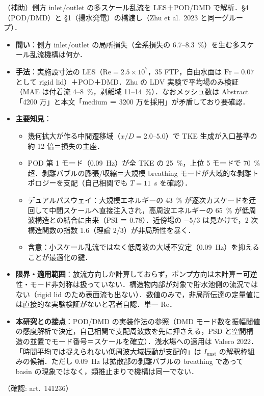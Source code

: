 \documentclass[11pt]{jsarticle}
\newcommand{\litref}[1]{{\large\bfseries\color{citecolor}#1}}
\begin{document}
\noindent\litref{Bai et al. (2026)}\quad（補助）側方 inlet/outlet の多スケール乱流を LES＋POD/DMD で解析．§4（POD/DMD）と §1（揚水発電）の橋渡し（Zhu et al.\ 2023 と同一グループ）．
\begin{itemize}
  \item \textbf{問い}：側方 inlet/outlet の局所損失（全系損失の 6.7--8.3~\%）を生む多スケール乱流機構は何か．
  \item \textbf{手法}：実施設寸法の LES（$\mathrm{Re} = 2.5\times10^7$，35 FTP，自由水面は $\mathrm{Fr} = 0.07$ として rigid lid）＋POD＋DMD．Zhu の LDV 実験で平均場のみ検証（MAE は付着流 4--8~\%，剥離域 11--14~\%）．なおメッシュ数は Abstract「4200 万」と本文「medium ＝ 3200 万を採用」が矛盾しており要確認．
  \item \textbf{主要知見}：
  \begin{itemize}
    \item 幾何拡大が作る中間遷移域（$x/D = 2.0$--$5.0$）で TKE 生成が入口基準の約 12 倍＝損失の主座．
    \item POD 第 1 モード（0.09~Hz）が全 TKE の 25~\%，上位 5 モードで 70~\% 超．剥離バブルの膨張/収縮＝大規模 breathing モードが大域的な剥離トポロジーを支配（自己相関でも $T = 11$~s を確認）．
    \item デュアルパスウェイ：大規模エネルギーの 43~\% が逐次カスケードを迂回して中間スケールへ直接注入され，高周波エネルギーの 65~\% が低周波構造との結合に由来（PSI ＝ 0.78）．近傍場の $-5/3$ は見かけで，2 次構造関数の指数 1.6（理論 2/3）が非局所性を暴く．
    \item 含意：小スケール乱流ではなく低周波の大域不安定（0.09~Hz）を抑えることが最適化の鍵．
  \end{itemize}
  \item \textbf{限界・適用範囲}：放流方向しか計算しておらず，ポンプ方向は未計算＝可逆性・モード非対称は扱っていない．構造物内部が対象で貯水池側の流況ではない（rigid lid のため表面流も出ない）．数値のみで，非局所伝達の定量値には直接的な実験検証がないと著者自認．単一 Re．
  \item \textbf{本研究との接点}：POD/DMD の実装作法の参照（DMD モード数を振幅閾値の感度解析で決定，自己相関で支配周波数を先に押さえる，PSD と空間構造の並置でモード番号＝スケールを確立）．浅水場への適用は Valero 2022．「時間平均では捉えられない低周波大域振動が支配的」は $I_\mathrm{unst}$ の解釈枠組みの候補．ただし 0.09~Hz は拡散部の剥離バブルの breathing であって basin の現象ではなく，類推止まりで機構は同一でない．
\end{itemize}
\noindent（確認: art.\ 141236）
\end{document}
